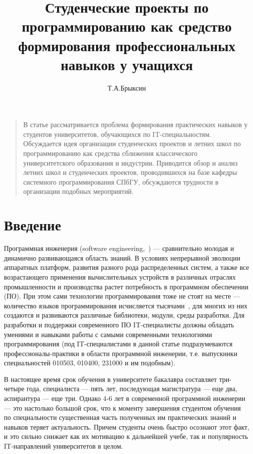 \documentclass[a5paper]{article}
\title{Студенческие проекты по программированию как средство формирования профессиональных навыков у учащихся}
\author{Т.А.Брыксин}
\date{}
\begin{document}
\maketitle
\thispagestyle{empty}

\begin{quote}
\small\noindent
В статье рассматривается проблема формирования практических навыков у студентов университетов, обучающихся по IT-специальностям. Обсуждается идея организации студенческих проектов и летних школ по программированию как средства сближения классического университетского образования и индустрии. Приводится обзор и анализ летних школ и студенческих проектов, проводившихся на базе кафедры системного программирования СПбГУ, обсуждаются трудности в организации подобных мероприятий.
\end{quote}

\section*{Введение} 
Программная инженерия (software engineering,~\cite{swebok}) — сравнительно молодая и динамично развивающаяся область знаний. В условиях непрерывной эволюции аппаратных платформ, развития разного рода распределенных систем, а также все возрастающего применения вычислительных устройств в различных отраслях промышленности и производства растет потребность в программном обеспечении (ПО).  При этом сами технологии программирования тоже не стоят на месте — количество языков программирования исчисляется тысячами~\cite{langList}, для многих из них создаются и развиваются различные библиотеки, модули, среды разработки. Для разработки и поддержки современного ПО IT-специалисты должны обладать умениями и навыками работы с самыми современными технологиями программирования (под IT-специалистами в данной статье подразумеваются профессионалы-практики в области программной инженерии, т.е. выпускники специальностей 010503, 010400, 231000 и им подобным). 
 
В настоящее время срок обучения в университете бакалавра составляет три-четыре года, специалиста — пять лет, последующая магистратура — еще два, аспирантура — еще три. Однако 4-6 лет в современной программной инженерии — это настолько большой срок, что к моменту завершения студентом обучения по специальности существенная часть полученных им практических знаний и навыков теряет актуальность. Причем студенты очень быстро осознают этот факт, и это сильно снижает как их мотивацию к дальнейшей учебе, так и популярность IT-направлений университетов в целом. 
\end{document}
